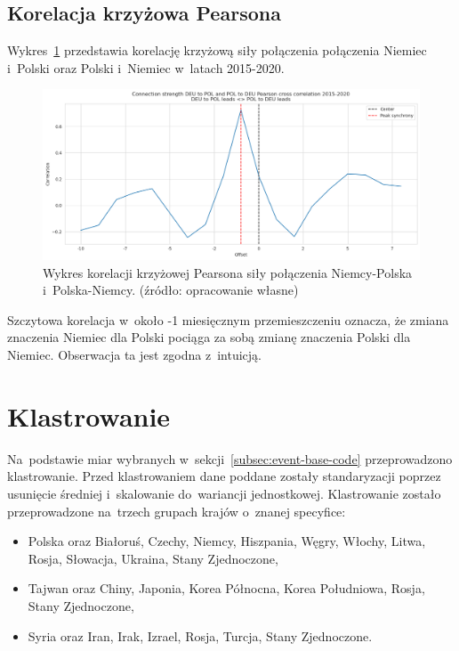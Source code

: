 \documentclass[11pt]{report}
\begin{document}
    \subsection{Korelacja krzyżowa Pearsona}
    Wykres~\ref{fig:Connection strength DEU to POL and POL to DEU Pearson cross correlation 2015-2020} przedstawia korelację krzyżową siły połączenia połączenia Niemiec i~Polski oraz Polski i~Niemiec w~latach 2015-2020.

    \begin{figure}[!ht]
        \centering
        \includegraphics[width=\linewidth]{../spade_proto/figures/auto_seek/connection strength/cross_correlation/Connection strength DEU to POL and POL to DEU Pearson cross correlation 2015-2020 1M.png}
        \caption{Wykres korelacji krzyżowej Pearsona siły połączenia
        Niemcy-Polska i~Polska-Niemcy. (źródło: opracowanie własne)}
        \label{fig:Connection strength DEU to POL and POL to DEU Pearson cross correlation 2015-2020}
    \end{figure}

    Szczytowa korelacja w~około -1 miesięcznym przemieszczeniu oznacza, że zmiana znaczenia Niemiec dla Polski pociąga za sobą zmianę znaczenia Polski dla Niemiec.
    Obserwacja ta jest zgodna z~intuicją.


    \section{Klastrowanie}\label{sec:klastrowanie}
    Na~podstawie miar wybranych w~sekcji~\ref{subsec:event-base-code} przeprowadzono klastrowanie.
    Przed klastrowaniem dane poddane zostały standaryzacji poprzez usunięcie średniej i~skalowanie do~wariancji jednostkowej.
    Klastrowanie zostało przeprowadzone na~trzech grupach krajów o~znanej specyfice:
    \begin{itemize}
        \item Polska oraz Białoruś, Czechy, Niemcy, Hiszpania, Węgry, Włochy, Litwa, Rosja, Słowacja, Ukraina, Stany Zjednoczone,
        \item Tajwan oraz Chiny, Japonia, Korea Północna, Korea Południowa, Rosja, Stany Zjednoczone,
        \item Syria oraz Iran, Irak, Izrael, Rosja, Turcja, Stany Zjednoczone.
    \end{itemize}
\end{document}
